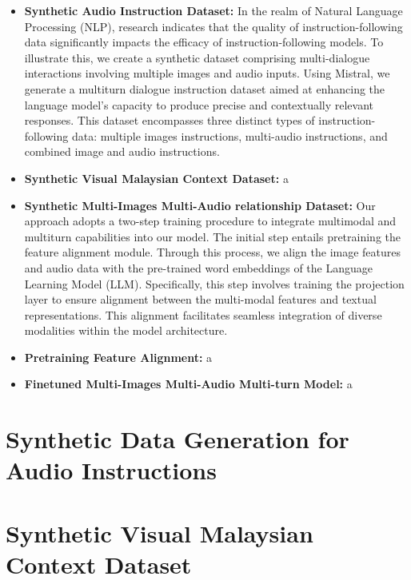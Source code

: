 \documentclass[preprint]{article}
\begin{document}
\begin{itemize}

  \item \textbf{Synthetic Audio Instruction Dataset:} In the realm of Natural Language Processing (NLP), research indicates that the quality of instruction-following data significantly impacts the efficacy of instruction-following models. To illustrate this, we create a synthetic dataset comprising multi-dialogue interactions involving multiple images and audio inputs. Using Mistral, we generate a multiturn dialogue instruction dataset aimed at enhancing the language model's capacity to produce precise and contextually relevant responses. This dataset encompasses three distinct types of instruction-following data: multiple images instructions,
        multi-audio instructions, and combined image and audio instructions.

  \item \textbf{Synthetic Visual Malaysian Context Dataset:} a

  \item \textbf{Synthetic Multi-Images Multi-Audio relationship Dataset:} Our approach adopts a two-step training procedure to integrate multimodal and multiturn capabilities into our model. The initial step entails pretraining the feature alignment module. Through this process, we align the image features and audio data with the pre-trained word embeddings of the Language Learning Model (LLM). Specifically, this step involves training the projection layer to ensure alignment between the multi-modal features and textual representations. This alignment facilitates seamless integration of diverse modalities within the model architecture.

  \item \textbf{Pretraining Feature Alignment:} a

  \item \textbf{Finetuned Multi-Images Multi-Audio Multi-turn Model:} a

\end{itemize}

\section{Synthetic Data Generation for Audio Instructions}

\section{Synthetic Visual Malaysian Context Dataset}
\end{document}
